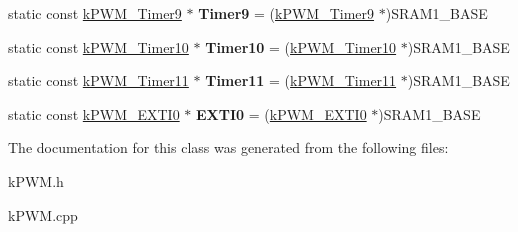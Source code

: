 \begin{DoxyCompactItemize}
\item 
static const \hyperlink{structkPWM__Timer9}{k\+P\+W\+M\+\_\+\+Timer9} $\ast$ {\bfseries Timer9} = (\hyperlink{structkPWM__Timer9}{k\+P\+W\+M\+\_\+\+Timer9} $\ast$)S\+R\+A\+M1\+\_\+\+B\+A\+SE\hypertarget{classkPWM_a34727b8954262d0c9e74c51be8e02061}{}\label{classkPWM_a34727b8954262d0c9e74c51be8e02061}

\item 
static const \hyperlink{structkPWM__Timer10}{k\+P\+W\+M\+\_\+\+Timer10} $\ast$ {\bfseries Timer10} = (\hyperlink{structkPWM__Timer10}{k\+P\+W\+M\+\_\+\+Timer10} $\ast$)S\+R\+A\+M1\+\_\+\+B\+A\+SE\hypertarget{classkPWM_ac64472325767a9af8c24f18e0130dd33}{}\label{classkPWM_ac64472325767a9af8c24f18e0130dd33}

\item 
static const \hyperlink{structkPWM__Timer11}{k\+P\+W\+M\+\_\+\+Timer11} $\ast$ {\bfseries Timer11} = (\hyperlink{structkPWM__Timer11}{k\+P\+W\+M\+\_\+\+Timer11} $\ast$)S\+R\+A\+M1\+\_\+\+B\+A\+SE\hypertarget{classkPWM_af71367db3415ff7aa3581897e4fbb679}{}\label{classkPWM_af71367db3415ff7aa3581897e4fbb679}

\item 
static const \hyperlink{structkPWM__EXTI0}{k\+P\+W\+M\+\_\+\+E\+X\+T\+I0} $\ast$ {\bfseries E\+X\+T\+I0} = (\hyperlink{structkPWM__EXTI0}{k\+P\+W\+M\+\_\+\+E\+X\+T\+I0} $\ast$)S\+R\+A\+M1\+\_\+\+B\+A\+SE\hypertarget{classkPWM_a345f41328958a48fde4b02c0f1325fb7}{}\label{classkPWM_a345f41328958a48fde4b02c0f1325fb7}

\end{DoxyCompactItemize}


The documentation for this class was generated from the following files\+:\begin{DoxyCompactItemize}
\item 
k\+P\+W\+M.\+h\item 
k\+P\+W\+M.\+cpp\end{DoxyCompactItemize}
